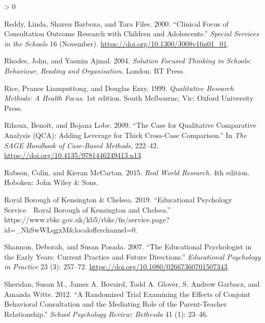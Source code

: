 \documentclass[
]{article}
\newlength{\cslhangindent}
\newenvironment{CSLReferences}[2] %
 {%
  \setlength{\parindent}{0pt}
  \ifodd #1 \everypar{\setlength{\hangindent}{\cslhangindent}}\ignorespaces\fi
  \ifnum #2 > 0
  \setlength{\parskip}{#2\baselineskip}
  \fi
 }%
 {}
\begin{document}
\begin{CSLReferences}{1}{0}
\leavevmode\hypertarget{ref-reddyClinicalFocusConsultation2000}{}%
Reddy, Linda, Sharen Barboza, and Tara Files. 2000. {``Clinical {Focus}
of {Consultation Outcome Research} with {Children} and {Adolescents}.''}
\emph{Special Services in the Schools} 16 (November).
\url{https://doi.org/10.1300/J008v16n01_01}.

\leavevmode\hypertarget{ref-rhodesSolutionFocusedThinking2004a}{}%
Rhodes, John, and Yasmin Ajmal. 2004. \emph{Solution Focused Thinking in
Schools: Behaviour, Reading and Organisation}. {London}: {BT Press}.

\leavevmode\hypertarget{ref-riceQualitativeResearchMethods1999}{}%
Rice, Pranee Liamputtong, and Douglas Ezzy. 1999. \emph{Qualitative
{Research Methods}: {A Health Focus}}. 1st edition. {South Melbourne,
Vic}: {Oxford University Press}.

\leavevmode\hypertarget{ref-rihouxCaseQualitativeComparative2009}{}%
Rihoux, Benoît, and Bojana Lobe. 2009. {``The Case for {Qualitative
Comparative Analysis} ({QCA}): {Adding Leverage} for Thick Cross-Case
Comparison.''} In \emph{The {SAGE Handbook} of {Case}-{Based Methods}},
222--42. \url{https://doi.org/10.4135/9781446249413.n13}.

\leavevmode\hypertarget{ref-robsonRealWorldResearch2015}{}%
Robson, Colin, and Kieran McCartan. 2015. \emph{Real {World Research}}.
4th edition. {Hoboken}: {John Wiley \& Sons}.

\leavevmode\hypertarget{ref-royalboroughofkensingtonchelseaEducationalPsychologyService2019}{}%
Royal Borough of Kensington \& Chelsea. 2019. {``Educational {Psychology
Service}~\textbar~{Royal Borough} of {Kensington} and {Chelsea}.''}
https://www.rbkc.gov.uk/kb5/rbkc/fis/service.page?id=\_NhSwWLqgxM\&localofferchannel=0.

\leavevmode\hypertarget{ref-shannonEducationalPsychologistEarly2007}{}%
Shannon, Deborah, and Susan Posada. 2007. {``The {Educational
Psychologist} in the {Early Years}: {Current} Practice and Future
Directions.''} \emph{Educational Psychology in Practice} 23 (3):
257--72. \url{https://doi.org/10.1080/02667360701507343}.

\leavevmode\hypertarget{ref-sheridanRandomizedTrialExamining2012}{}%
Sheridan, Susan M., James A. Bovaird, Todd A. Glover, S. Andrew Garbacz,
and Amanda Witte. 2012. {``A {Randomized Trial Examining} the {Effects}
of {Conjoint Behavioral Consultation} and the {Mediating Role} of the
{Parent}-{Teacher Relationship}.''} \emph{School Psychology Review;
Bethesda} 41 (1): 23--46.


\end{CSLReferences}
\end{document}
